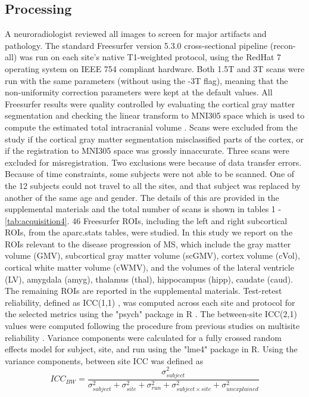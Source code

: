 \documentclass{article}
\begin{document}
\subsection{Processing}
 A neuroradiologist reviewed all images to screen for major artifacts and pathology. The standard Freesurfer \cite{freesurferPaper} version 5.3.0 cross-sectional pipeline (recon-all) was run on each site's native T1-weighted protocol, using the RedHat 7 operating system on IEEE 754 compliant hardware. Both 1.5T and 3T scans were run with the same parameters (without using the -3T flag), meaning that the non-uniformity correction parameters were kept at the default values. All Freesurfer results were quality controlled by evaluating the cortical gray matter segmentation and checking the  linear transform to MNI305 space which is used to compute the estimated total intracranial volume \cite{buckner2004unified}. Scans were excluded from the study if the cortical gray matter segmentation misclassified parts of the cortex, or if the registration to MNI305 space was grossly innaccurate. Three scans were excluded for misregistration. Two exclusions were because of data transfer errors. Because of time constraints, some subjects were not able to be scanned. One of the 12 subjects could not travel to all the sites, and that subject was replaced by another of the same age and gender. The details of this are provided in the supplemental materials and the total number of scans is shown in tables 1 - \ref{tab:acquisition4}. 46 Freesurfer ROIs, including the left and right subcortical ROIs, from the aparc.stats tables, were studied. In this study we report on the ROIs relevant to the disease progression of MS, which include the gray matter volume (GMV), subcortical gray matter volume (scGMV), cortex volume (cVol), cortical white matter volume (cWMV), and the volumes of the lateral ventricle (LV), amygdala (amyg), thalamus (thal), hippocampus (hipp), caudate (caud). The remaining ROIs are reported in the supplemental materials. 
Test-retest reliability, defined as ICC(1,1) \cite{fmriReliability}, was computed across each site and protocol for the selected metrics using the "psych" package in R \cite{psych}. The between-site ICC(2,1) values were computed following the procedure from previous studies on multisite reliability \cite{fmriReliability,cannon2014}. Variance components were calculated for a fully crossed random effects model for subject, site, and run using the "lme4" package in R. Using the variance components, between site ICC was defined as
\begin{equation}
ICC_{BW} = \frac{\sigma_{subject}^2}{\sigma_{subject}^2+\sigma_{site}^2+\sigma_{run}^2+\sigma_{subject \times site}^2 + \sigma_{unexplained}^2}
\end{equation}
\end{document}
